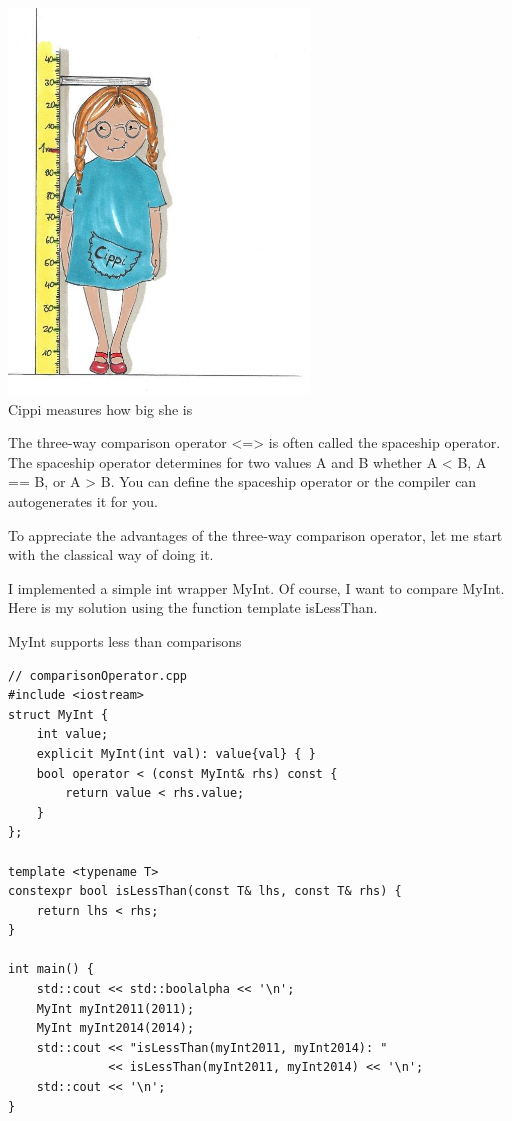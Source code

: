 
\begin{center}
\includegraphics[width=0.6\textwidth]{content/3/chapter4/images/26.png}\\
Cippi measures how big she is
\end{center}

The three-way comparison operator <=> is often called the spaceship operator. The spaceship operator determines for two values A and B whether A < B, A == B, or A > B. You can define the spaceship operator or the compiler can autogenerates it for you.

To appreciate the advantages of the three-way comparison operator, let me start with the classical way of doing it.


I implemented a simple int wrapper MyInt. Of course, I want to compare MyInt. Here is my solution using the function template isLessThan.

\noindent
MyInt supports less than comparisons
\begin{lstlisting}[style=styleCXX]
// comparisonOperator.cpp
#include <iostream>
struct MyInt {
	int value;
	explicit MyInt(int val): value{val} { }
	bool operator < (const MyInt& rhs) const {
		return value < rhs.value;
	}
};

template <typename T>
constexpr bool isLessThan(const T& lhs, const T& rhs) {
	return lhs < rhs;
}

int main() {
	std::cout << std::boolalpha << '\n';
	MyInt myInt2011(2011);
	MyInt myInt2014(2014);
	std::cout << "isLessThan(myInt2011, myInt2014): "
			  << isLessThan(myInt2011, myInt2014) << '\n';
	std::cout << '\n';
}
\end{lstlisting}

